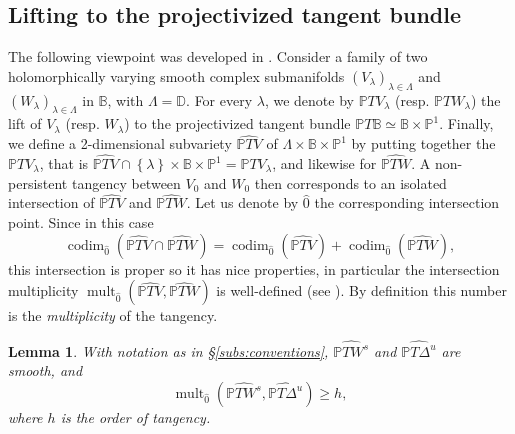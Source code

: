 \documentclass[11pt, oneside]{amsart}
\newcommand{\B}{\mathbb{B}}
\newcommand{\D}{\mathbb{D}}
\renewcommand{\P}{\mathbb{P}}
\newcommand{\set}[1]{\left\{#1\right\}}
\newcommand{\pu}{{\mathbb{P}^1}}
\newcommand{\lrpar}[1]{\left(#1\right)}
\newcommand{\la}{\lambda}
\DeclareMathOperator{\mult}{mult}
\DeclareMathOperator{\codim}{codim}
\newtheorem{lem}[prop] {Lemma}
\theoremstyle{remark}
\theoremstyle{definition}
\theoremstyle{theorem}
\begin{document}
\subsection{Lifting to the projectivized tangent bundle} \label{subs:lifting}
The following viewpoint was developed in \cite[\S 9.1]{tangencies}. Consider a family of two holomorphically varying smooth complex submanifolds 
$(V_\la)_{\lambda\in \Lambda}$ and $(W_\la)_{\lambda\in \Lambda}$ in $\B$, with $\Lambda = \D$. 
For every $\la$, we denote by $\P T V_\lambda$ (resp. $\P T W_\lambda$) the lift 
of $V_\lambda$ (resp. $W_\lambda$) to the projectivized tangent bundle $\P T\B \simeq \B \times \pu$. Finally, we define a 2-dimensional subvariety 
 $\widehat {\P T V}$ of $\Lambda\times \B \times \pu$ by putting together the $\P T V_\lambda$, that 
 is $\widehat {\P T V} \cap \set{\lambda}\times \B \times \pu = \P T V_\lambda$, and likewise 
 for $\widehat {\P T W}$. 
  A non-persistent tangency between $V_0$ and $W_0$ then corresponds to an isolated   intersection of $\widehat {\P T V}$ and $\widehat {\P T W}$. Let us denote by $\widehat 0$ the corresponding intersection point.  Since in this 
 case $$\codim_{\widehat 0} 
 \lrpar{\widehat {\P T V}\cap \widehat {\P T W}}  = \codim_{\widehat 0}  \lrpar{\widehat {\P T V}} + 
 \codim_{\widehat 0}  \lrpar{\widehat {\P T W}}, $$ this intersection is proper so it has nice properties, in particular the intersection multiplicity $\mult_{\widehat{0}}\lrpar{\widehat {\P T V}, \widehat {\P T W}}$ is well-defined (see \cite[\S 12]{chirka}). By definition this number is the \emph{multiplicity} of the tangency. 
 
\begin{lem}\label{lem:multiplicity}
With notation as in \S \ref{subs:conventions}, $\widehat{\P TW^s}$ and 
$\widehat{\P T\Delta^u}$ are smooth, and   
\begin{equation}\label{eq:multiplicity}
\mult_{\widehat{0}}\lrpar{\widehat {\P T W^s}, \widehat {\P T \Delta^u}}\geq h ,
\end{equation}
where $h$ is the order of tangency.  
\end{lem}
\end{document}
